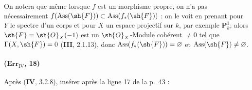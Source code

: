 \begin{env}[3.1.10.5]
\label{IV.3.1.10.5}
On notera que même lorsque $f$ est un morphisme propre, on n'a pas
nécessairement
$f(\operatorname{Ass}(\sh{F}))\subset\operatorname{Ass}(f_*(\sh{F}))$ :
on le voit en prenant pour $Y$ le spectre d'un corps et pour $X$ un
espace projectif sur $k$, par exemple $\mathbf P^1_k$; alors
$\sh{F}=\sh{O}_X(\setmin 1)$ est un $\sh{O}_X$-Module cohérent $\neq0$ tel
que $\Gamma(X,\sh{F})=0$ (\textbf{III}, 2.1.13), donc
$\operatorname{Ass}(f_*(\sh{F}))=\varnothing$ et
$\operatorname{Ass}(\sh{F})\neq\varnothing$.
\end{env}

\paragraph{($\mathbf{Err}_{\mathrm{IV}}$, 18)}
Après (\textbf{IV}, 3.2.8), insérer après la ligne 17 de la p.~43 :

